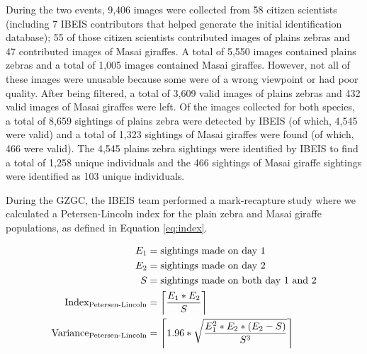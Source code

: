 During the two events, 9,406 images were collected from 58 citizen scientists (including 7 IBEIS contributors that helped generate the initial identification database); 55 of those citizen scientists contributed images of plains zebras and 47 contributed images of Masai giraffes.  A total of 5,550 images contained plains zebras and a total of 1,005 images contained Masai giraffes.  However, not all of these images were unusable because some were of a wrong viewpoint or had poor quality.  After being filtered, a total of 3,609 valid images of plains zebras and 432 valid images of Masai giraffes were left.  Of the images collected for both species, a total of 8,659 sightings of plains zebra were detected by IBEIS (of which, 4,545 were valid) and a total of 1,323 sightings of Masai giraffes were found (of which, 466 were valid).  The 4,545 plains zebra sightings were identified by IBEIS to find a total of 1,258 unique individuals and the 466 sightings of Masai giraffe sightings were identified as 103 unique individuals.

During the GZGC, the IBEIS team performed a mark-recapture study \cite{krebs_ecological_1999, petersen_yearly_1896, pradel_utilization_1996, robson_sample_1964, seber_estimation_1982} where we calculated a Petersen-Lincoln index \cite{pacala_population_1985} for the plain zebra and Masai giraffe populations, as defined in Equation \ref{eq:index}.

\begin{equation}
    \label{eq:index}
    \begin{split}
        E_1 & = \text{sightings made on day 1} \\
        E_2 & = \text{sightings made on day 2} \\
        S & =  \text{sightings made on both day 1 and 2} \\
        \text{Index}_\text{Petersen-Lincoln} & = \ceil*{ \dfrac{E_1 * E_2}{S} } \\
        \text{Variance}_\text{Petersen-Lincoln} & = \ceil*{1.96 * \sqrt{\dfrac{E_1^2 * E_2 * (E_2 - S)}{S^3}} } \\
    \end{split}
\end{equation}

